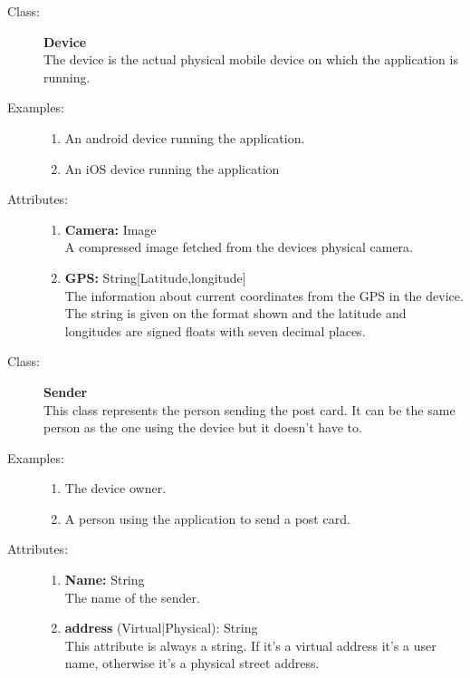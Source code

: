 \documentclass[10pt,a4paper]{article}
\begin{document}
\begin{description}
\item[Class:] \textbf{Device} \hfill \\
The device is the actual physical mobile device on which the application is running.

\item[Examples:] \hfill
\begin{enumerate}
\item An android device running the application.
\item An iOS device running the application
\end{enumerate}

\item[Attributes:] \hfill
\begin{enumerate}
\item \textbf{Camera:} Image \hfill \\A compressed image fetched from the devices physical camera.
\item \textbf{GPS:} String[Latitude,longitude] \hfill \\The information about current coordinates from the GPS in the device. The string is given on the format shown and the latitude and longitudes are signed floats with seven decimal places.
\end{enumerate}
\end{description}

\hrulefill

\begin{description}
\item[Class:] \textbf{Sender} \hfill \\
This class represents the person sending the post card. It can be the same person as the one using the device but it doesn't have to.

\item[Examples:] \hfill
\begin{enumerate}
\item The device owner.
\item A person using the application to send a post card.
\end{enumerate}

\item[Attributes:] \hfill
\begin{enumerate}
\item \textbf{Name:} String \hfill \\The name of the sender. 
\item \textbf{address} (Virtual|Physical): String \hfill \\This attribute is always a string. If it's a virtual address it's a user name, otherwise it's a physical street address. 
\end{enumerate}
\end{description}
\end{document}
